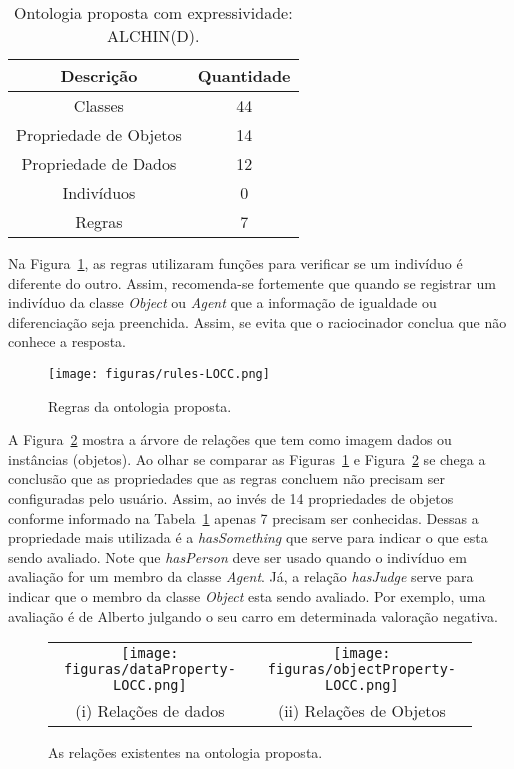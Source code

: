 \begin{table}
	\caption{Ontologia proposta com expressividade: ALCHIN(D).}
	\label{tab:oa:geral}
	\begin{center}
	\begin{tabular}{|c|c|}
		\hline
		Descrição & Quantidade \\ \hline
		Classes &  44 		\\ \hline
		Propriedade de Objetos & 14 \\ \hline
		Propriedade de Dados & 12 \\ \hline
		Indivíduos &  0		\\ \hline
		Regras & 7 \\ \hline
	\end{tabular}
	\end{center}
\end{table}

Na Figura~\ref{fig:rlocc}, as regras utilizaram funções para verificar se
um indivíduo é diferente do outro. Assim, recomenda-se fortemente que quando
se registrar um indivíduo da classe \emph{Object} ou \emph{Agent} que a
informação de igualdade ou diferenciação seja preenchida\dev{}. Assim, se
evita que o raciocinador conclua que não conhece a resposta.

\begin{figure}[t]
  \centering
  \texttt{[image: figuras/rules-LOCC.png]}
  \caption{Regras da ontologia proposta.}
  \label{fig:rlocc}
\end{figure}

A Figura~\ref{fig:kplocc} mostra a árvore de relações que tem como imagem
dados ou instâncias (objetos). Ao olhar se comparar as Figuras~\ref{fig:rlocc}
e Figura~\ref{fig:kplocc} se chega a conclusão que as propriedades que as
regras concluem não precisam ser configuradas pelo usuário. Assim, ao invés de
14 propriedades de objetos conforme informado na Tabela~\ref{tab:oa:geral}
apenas 7 precisam ser conhecidas. Dessas a propriedade mais utilizada é a
\emph{hasSomething} que serve para indicar o que esta sendo avaliado. Note que
\emph{hasPerson} deve ser usado quando o indivíduo em avaliação for um membro
da classe \emph{Agent}. Já, a relação \emph{hasJudge} serve para indicar que o
membro da classe \emph{Object} esta sendo avaliado. Por exemplo, uma avaliação
é de Alberto julgando o seu carro em determinada valoração
negativa.

\begin{figure}[b]
  \centering
  \begin{tabular}{cc}
  \texttt{[image: figuras/dataProperty-LOCC.png]} & \texttt{[image: figuras/objectProperty-LOCC.png]} \\
  (i) Relações de dados & (ii) Relações de Objetos
  \end{tabular}
  \caption{As relações existentes na ontologia proposta.}
  \label{fig:kplocc}
\end{figure}

